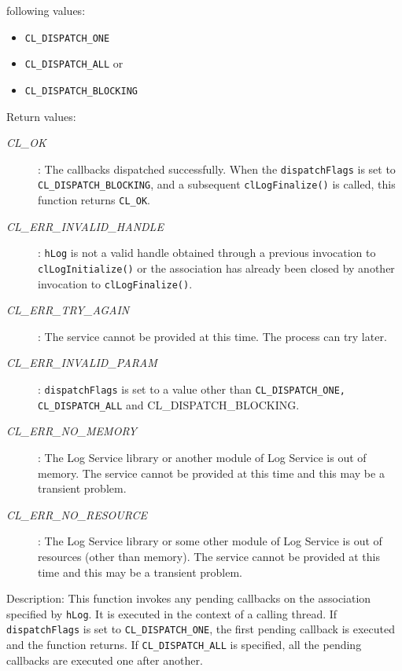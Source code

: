 \begin{flushleft}
\begin{Desc}
\begin{description}
following values: 
\begin{itemize}
\item
{\tt{CL\_\-DISPATCH\_\-ONE}}
\item
{\tt{CL\_\-DISPATCH\_\-ALL}} or 
\item
{\tt{CL\_\-DISPATCH\_\-BLOCKING}}
\end{itemize}
\end{description}
\end{Desc}
\begin{Desc}
\item[Return values:]
\begin{description}
\item[{\em CL\_\-OK}]: The callbacks dispatched successfully. When the {\tt{dispatchFlags}} is set to {\tt{CL\_\-DISPATCH\_\-BLOCKING}}, and a subsequent
{\tt{clLogFinalize()}} is called, this function returns {\tt{CL\_\-OK}}.
\item[{\em CL\_\-ERR\_\-INVALID\_\-HANDLE}]: {\tt{hLog}} is not a valid handle obtained through a previous invocation to 
{\tt{clLogInitialize()}} or the association has already been closed by another invocation to {\tt{clLogFinalize()}}.
\item[{\em CL\_\-ERR\_\-TRY\_\-AGAIN}]: The service cannot be provided at this time. The process can try later.
\item[{\em CL\_\-ERR\_\-INVALID\_\-PARAM}]: {\tt{dispatchFlags}} is set to a value other than {\tt{CL\_\-DISPATCH\_\-ONE, CL\_\-DISPATCH\_\-ALL}} and 
CL\_\-DISPATCH\_\-BLOCKING.
\item[{\em CL\_\-ERR\_\-NO\_\-MEMORY}]: The Log Service library or another module of Log Service is out of memory. The service cannot 
be provided at this time and this may be a transient problem.
\item[{\em CL\_\-ERR\_\-NO\_\-RESOURCE}]: The Log Service library or some other module of Log Service is out of resources 
(other than memory). The service cannot be provided at this time and this may be a transient problem.
\end{description}
\end{Desc}
\begin{Desc}
\item[Description:] This function invokes any pending callbacks on the association specified by {\tt{hLog}}. It is executed in the context of a 
calling thread. If {\tt{dispatchFlags}} is set to {\tt{CL\_\-DISPATCH\_\-ONE}}, the first pending callback is executed and the function returns. If 
{\tt{CL\_\-DISPATCH\_\-ALL}} is specified, all the pending callbacks are executed one after another. 

\end{Desc}
\end{flushleft}
